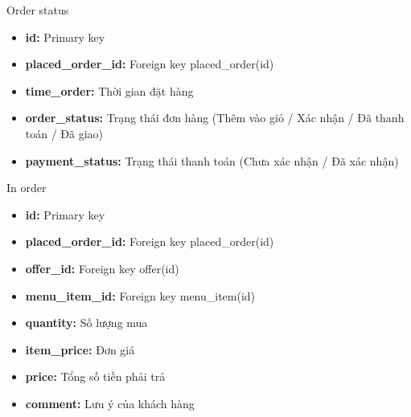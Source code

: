 \documentclass[aspectratio=43,xcolor=dvipsnames]{beamer}
\begin{document}
	\begin{frame}{Order status}
		\begin{itemize}
			\item \textbf{id:} Primary key
			\item \textbf{placed\_order\_id:} Foreign key placed\_order(id)
			\item \textbf{time\_order:} Thời gian đặt hàng
			\item \textbf{order\_status:} Trạng thái đơn hàng (Thêm vào giỏ / Xác nhận / Đã thanh toán / Đã giao)
			\item \textbf{payment\_status:} Trạng thái thanh toán (Chưa xác nhận / Đã xác nhận)
		\end{itemize}
	\end{frame}
	
	\begin{frame}{In order}
		\begin{itemize}
			\item \textbf{id:} Primary key
			\item \textbf{placed\_order\_id:} Foreign key placed\_order(id)
			\item \textbf{offer\_id:} Foreign key offer(id)
			\item \textbf{menu\_item\_id:} Foreign key menu\_item(id)
			\item \textbf{quantity:} Số lượng mua
			\item \textbf{item\_price:} Đơn giá
			\item \textbf{price:} Tổng số tiền phải trả
			\item \textbf{comment:} Lưu ý của khách hàng
		\end{itemize}
	\end{frame}
	
\end{document}
